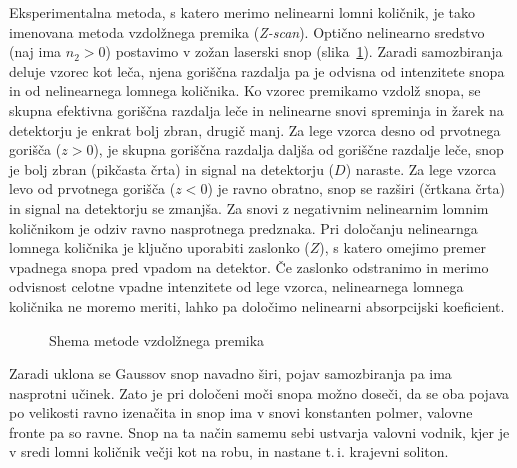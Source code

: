 \begin{remark}
Eksperimentalna metoda, s katero merimo nelinearni lomni količnik, je tako imenovana
metoda vzdolžnega premika ({\it Z-scan}). Optično nelinearno sredstvo (naj ima $n_2>0$)
postavimo v zožan laserski snop (slika~\ref{fig:zscan}). 
Zaradi samozbiranja deluje vzorec kot leča, njena goriščna razdalja
pa je odvisna od intenzitete snopa in od nelinearnega lomnega količnika. Ko vzorec 
premikamo vzdolž snopa, se skupna efektivna goriščna razdalja leče in nelinearne snovi 
spreminja in žarek na detektorju je enkrat bolj zbran, drugič manj. 
Za lege vzorca desno od prvotnega gorišča ($z>0$), je skupna goriščna
razdalja daljša od goriščne razdalje leče, snop je bolj zbran (pikčasta črta) in signal 
na detektorju ($D$) naraste. Za lege vzorca levo
od prvotnega gorišča ($z<0$) je ravno obratno, snop se razširi (črtkana črta) in 
signal na detektorju se zmanjša. Za snovi z negativnim nelinearnim lomnim količnikom
je odziv ravno nasprotnega predznaka. Pri določanju nelinearnga lomnega količnika je
ključno uporabiti zaslonko ($Z$), s katero omejimo premer vpadnega snopa pred vpadom
na detektor. Če zaslonko odstranimo in merimo 
odvisnost celotne vpadne intenzitete od lege vzorca, nelinearnega lomnega količnika 
ne moremo meriti, lahko pa določimo nelinearni absorpcijski koeficient. 

\begin{figure}[h!]
\raggedleft 
\def\svgwidth{130truemm} 

\caption{Shema metode vzdolžnega premika}
\label{fig:zscan}
\end{figure}
\end{remark}

Zaradi uklona se Gaussov snop navadno širi, pojav samozbiranja pa ima nasprotni
učinek. Zato je pri določeni moči snopa možno doseči, da se oba pojava po
velikosti ravno izenačita in snop ima v snovi konstanten polmer, valovne
fronte pa so ravne. Snop na ta način samemu sebi ustvarja valovni vodnik, kjer
je v sredi lomni količnik večji kot na robu, in nastane t.\,i. krajevni soliton.

